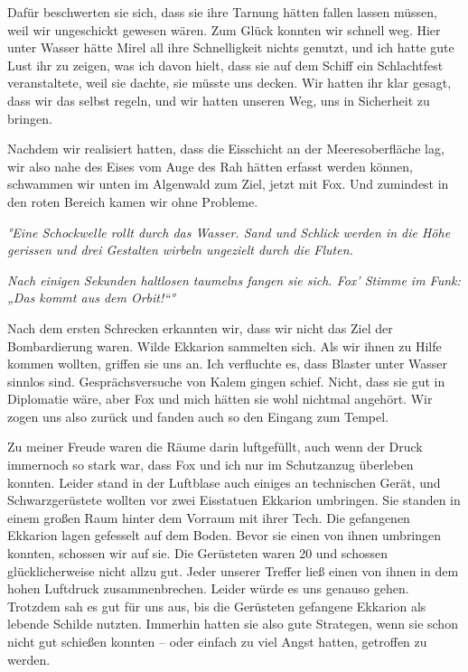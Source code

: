 \documentclass[11pt]{article}
\begin{document}
Dafür beschwerten sie sich, dass sie ihre Tarnung hätten fallen lassen
müssen, weil wir ungeschickt gewesen wären. Zum Glück konnten wir
schnell weg. Hier unter Wasser hätte Mirel all ihre Schnelligkeit nichts
genutzt, und ich hatte gute Lust ihr zu zeigen, was ich davon hielt,
dass sie auf dem Schiff ein Schlachtfest veranstaltete, weil sie dachte,
sie müsste uns decken. Wir hatten ihr klar gesagt, dass wir das selbst
regeln, und wir hatten unseren Weg, uns in Sicherheit zu bringen.

Nachdem wir realisiert hatten, dass die Eisschicht an der
Meeresoberfläche lag, wir also nahe des Eises vom Auge des Rah hätten
erfasst werden können, schwammen wir unten im Algenwald zum Ziel, jetzt
mit Fox. Und zumindest in den roten Bereich kamen wir ohne Probleme.

\emph{°Eine Schockwelle rollt durch das Wasser. Sand und Schlick werden
in die Höhe gerissen und drei Gestalten wirbeln ungezielt durch die
Fluten.}

\emph{Nach einigen Sekunden haltlosen taumelns fangen sie sich. Fox'
Stimme im Funk: „Das kommt aus dem Orbit!``°}

Nach dem ersten Schrecken erkannten wir, dass wir nicht das Ziel der
Bombardierung waren. Wilde Ekkarion sammelten sich. Als wir ihnen zu
Hilfe kommen wollten, griffen sie uns an. Ich verfluchte es, dass
Blaster unter Wasser sinnlos sind. Gesprächsversuche von Kalem gingen
schief. Nicht, dass sie gut in Diplomatie wäre, aber Fox und mich hätten
sie wohl nichtmal angehört. Wir zogen uns also zurück und fanden auch so
den Eingang zum Tempel.

Zu meiner Freude waren die Räume darin luftgefüllt, auch wenn der Druck
immernoch so stark war, dass Fox und ich nur im Schutzanzug überleben
konnten. Leider stand in der Luftblase auch einiges an technischen
Gerät, und Schwarzgerüstete wollten vor zwei Eisstatuen Ekkarion
umbringen. Sie standen in einem großen Raum hinter dem Vorraum mit ihrer
Tech. Die gefangenen Ekkarion lagen gefesselt auf dem Boden. Bevor sie
einen von ihnen umbringen konnten, schossen wir auf sie. Die Gerüsteten
waren 20 und schossen glücklicherweise nicht allzu gut. Jeder unserer
Treffer ließ einen von ihnen in dem hohen Luftdruck zusammenbrechen.
Leider würde es uns genauso gehen. Trotzdem sah es gut für uns aus, bis
die Gerüsteten gefangene Ekkarion als lebende Schilde nutzten. Immerhin
hatten sie also gute Strategen, wenn sie schon nicht gut schießen
konnten -- oder einfach zu viel Angst hatten, getroffen zu werden.
\end{document}
